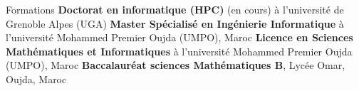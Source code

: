 
\begin{rubric}{Formations}
\entry*[]%
    \textbf{Doctorat en informatique (HPC)} (en cours) à l'université de Grenoble Alpes (UGA)
        \hfill {}
%
\entry*[]%
    \textbf{Master Spécialisé en Ingénierie Informatique} à l'université Mohammed Premier Oujda (UMPO), Maroc
    \hfill {}
%
\entry*[]%
    \textbf{Licence en Sciences Mathématiques et Informatiques} à l'université Mohammed Premier Oujda (UMPO), Maroc
        \hfill {}
%
%
\entry*[]%
    \textbf{Baccalauréat sciences Mathématiques B}, Lycée Omar, Oujda, Maroc
        \hfill {}
\end{rubric}
